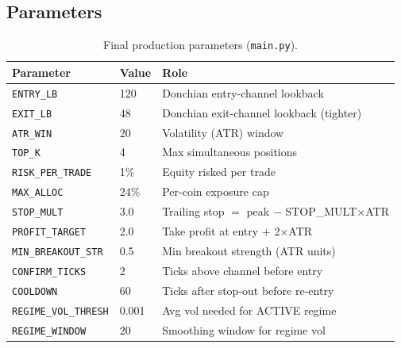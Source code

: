 \documentclass[11pt,a4paper]{article}
\newcommand{\param}[1]{\texttt{#1}}
\newcommand{\code}[1]{\texttt{#1}}
\begin{document}
\subsection{Parameters}
\begin{table}[h]
\centering
\small
\begin{tabular}{@{}llp{7.2cm}@{}}
\toprule
\textbf{Parameter} & \textbf{Value} & \textbf{Role} \\
\midrule
\param{ENTRY\_LB}           & 120     & Donchian entry-channel lookback \\
\param{EXIT\_LB}            & 48      & Donchian exit-channel lookback (tighter) \\
\param{ATR\_WIN}            & 20      & Volatility (ATR) window \\
\param{TOP\_K}              & 4       & Max simultaneous positions \\
\param{RISK\_PER\_TRADE}    & 1\%     & Equity risked per trade \\
\param{MAX\_ALLOC}          & 24\%    & Per-coin exposure cap \\
\param{STOP\_MULT}          & 3.0     & Trailing stop $=$ peak $-$ STOP\_MULT$\times$ATR \\
\param{PROFIT\_TARGET}      & 2.0     & Take profit at entry $+$ 2$\times$ATR \\
\param{MIN\_BREAKOUT\_STR}  & 0.5     & Min breakout strength (ATR units) \\
\param{CONFIRM\_TICKS}      & 2       & Ticks above channel before entry \\
\param{COOLDOWN}            & 60      & Ticks after stop-out before re-entry \\
\param{REGIME\_VOL\_THRESH} & 0.001   & Avg vol needed for ACTIVE regime \\
\param{REGIME\_WINDOW}      & 20      & Smoothing window for regime vol \\
\bottomrule
\end{tabular}
\caption{Final production parameters (\code{main.py}).}
\label{tab:params}
\end{table}
\end{document}
